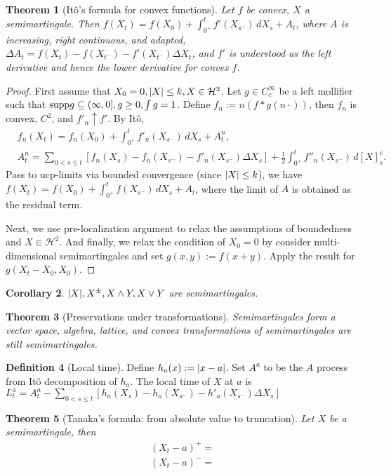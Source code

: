 \documentclass[openany,oneside]{book}
\newtheorem{thm}{Theorem}[section]
\newtheorem{cor}[thm]{Corollary}
\theoremstyle{definition}
\newtheorem{defn}[thm]{Definition}
\theoremstyle{remark}
\DeclarePairedDelimiter{\abs}{\lvert}{\rvert} %
\newcommand{\sH}[1][2]{\mathcal{H}^{#1}} %
\begin{document}
\begin{thm}[It\^o's formula for convex functions]
Let $f$ be convex, $X$ a semimartingale. Then $f(X_t) = f(X_0) + \int_{0^+}^t f'(X_{s^-}) \,d X_s + A_t$, where $A$ is increasing, right continuous, and adapted, $\Delta A_t = f(X_t) - f(X_{t^-}) - f'(X_{t^-}) \Delta X_t$, and $f'$ is understood as the left derivative and hence the lower derivative for convex $f$.
\end{thm}
\begin{proof}
First assume that $X_0 =0, \abs{X} \le k, X\in \sH$. Let $g\in C^\infty_c$ be a left mollifier such that ${\rm supp }g \subseteq (\infty,0], g \ge 0, \int g =1$. Define $f_n := n(f\ast g(n\cdot))$, then $f_n$ is convex, $C^2$, and $f'_n \uparrow f'$. By It\^o,
\begin{align*}
& f_n(X_t) = f_n(X_0) + \int_{0^+}^t f'_n(X_{s^-}) \,d X_s + A^n_t,\\
& A^n_t = \sum_{0<s\le t}[f_n(X_s) - f_n(X_{s^-}) - f'_n(X_{s^-}) \Delta X_s] + \frac{1}{2} \int_{0^+}^t f''_n(X_{s^-}) \,d [X]^c_s.
\end{align*}
Pass to ucp-limits via bounded convergence (since $\abs{X} \le k$), we have $f(X_t) = f(X_0) + \int_{0^+}^t f(X_{s^-}) \,d X_s + A_t$, where the limit of $A$ is obtained as the residual term.

Next, we use pre-localization argument to relax the assumptions of boundedness and $X\in \sH$. And finally, we relax the condition of $X_0=0$ by consider multi-dimensional semimartingales and set $g(x,y):=f(x+y)$. Apply the result for $g(X_t - X_0, X_0)$.
\end{proof}

\begin{cor}
$\abs{X}, X^{\pm}, X\wedge Y, X\vee Y$ are semimartingales.
\end{cor}


\begin{thm}[Preservations under transformations]
Semimartingales form a vector space, algebra, lattice, and convex transformations of semimartingales are still semimartingales.
\end{thm}


\begin{defn}[Local time]
Define $h_a(x):=\abs{x-a}$. Set $A^a$ to be the $A$ process from It\^o decomposition of $h_a$. The local time of $X$ at $a$ is $L^a_t = A^a_t - \sum_{0<s\le t}[h_a(X_s)-h_a(X_{s^-}) - h'_a(X_{s^-}) \Delta X_s]$
\end{defn}


\begin{thm}[Tanaka's formula: from absolute value to truncation]
Let $X$ be a semimartingale, then
\begin{align*}
(X_t-a)^+ = \\
(X_t-a)^- = 
\end{align*}
\end{thm}
\end{document}

